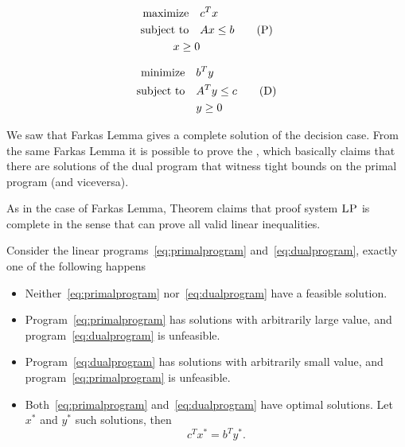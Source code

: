 \documentclass[a4paper,twoside,justified]{tufte-handout}
\begin{document}
\begin{figure}
\begin{minipage}[t]{0.5\textwidth}%
\begin{alignat}{2}
  \maximize c^{T}x\notag\\
\label{eq:primalprogram}\subjectto Ax \leq b \tag{P}\\
  \varpositive{x} \notag
\end{alignat}
\end{minipage}
\begin{minipage}[t]{0.5\textwidth}%
\begin{alignat}{2}
  \minimize b^{T}y \notag\\
  \label{eq:dualprogram}  \subjectto A^{T}y \leq c \tag{D}\\
  & \varpositive{y}\notag
\end{alignat}
\end{minipage}
\end{figure}

We saw that Farkas Lemma gives a complete solution of the decision
case. From the same Farkas Lemma it is possible to prove the
, which basically claims that there are
solutions of the dual program that witness tight bounds on the primal
program (and viceversa).

\begin{marginfigure}
  As in the case of Farkas Lemma,
  Theorem claims that proof system $\textsc{LP}$ is complete in
  the sense that can prove all valid linear inequalities.
\end{marginfigure}

\begin{theorem}
  Consider the linear programs~\eqref{eq:primalprogram}
  and~\eqref{eq:dualprogram}, exactly one of the following happens
  \begin{itemize}
    \item Neither~\eqref{eq:primalprogram} nor~\eqref{eq:dualprogram} have a
    feasible solution.
    \item Program~\eqref{eq:primalprogram} has solutions with
    arbitrarily large value, and program~\eqref{eq:dualprogram} is
    unfeasible.
    \item Program~\eqref{eq:dualprogram} has solutions with
    arbitrarily small value, and program~\eqref{eq:primalprogram} is
    unfeasible.
    \item Both~\eqref{eq:primalprogram} and~\eqref{eq:dualprogram}
    have optimal solutions. Let $ x^{*}$ and $ y^{*}$ such solutions, then
    \begin{equation*}
      c^{T} x^{*}=b^{T}y^{*}.
    \end{equation*}
  \end{itemize}
\end{theorem}
\end{document}
